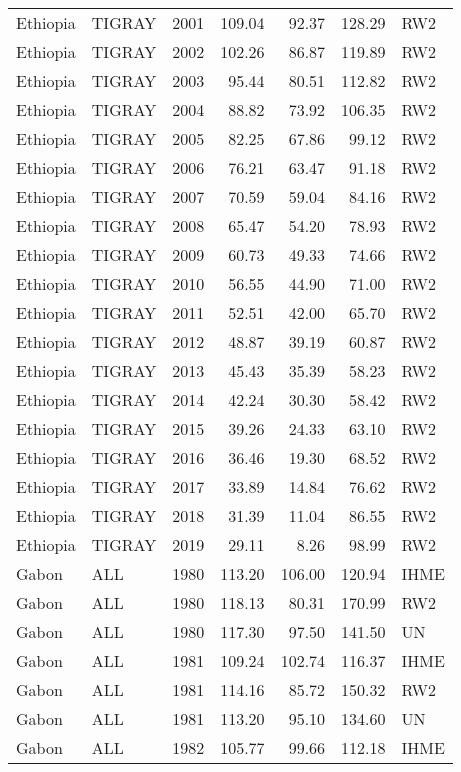 \begin{longtable}{lllrrrl}
  Ethiopia & TIGRAY & 2001 & 109.04 & 92.37 & 128.29 & RW2 \\ 
  Ethiopia & TIGRAY & 2002 & 102.26 & 86.87 & 119.89 & RW2 \\ 
  Ethiopia & TIGRAY & 2003 & 95.44 & 80.51 & 112.82 & RW2 \\ 
  Ethiopia & TIGRAY & 2004 & 88.82 & 73.92 & 106.35 & RW2 \\ 
  Ethiopia & TIGRAY & 2005 & 82.25 & 67.86 & 99.12 & RW2 \\ 
  Ethiopia & TIGRAY & 2006 & 76.21 & 63.47 & 91.18 & RW2 \\ 
  Ethiopia & TIGRAY & 2007 & 70.59 & 59.04 & 84.16 & RW2 \\ 
  Ethiopia & TIGRAY & 2008 & 65.47 & 54.20 & 78.93 & RW2 \\ 
  Ethiopia & TIGRAY & 2009 & 60.73 & 49.33 & 74.66 & RW2 \\ 
  Ethiopia & TIGRAY & 2010 & 56.55 & 44.90 & 71.00 & RW2 \\ 
  Ethiopia & TIGRAY & 2011 & 52.51 & 42.00 & 65.70 & RW2 \\ 
  Ethiopia & TIGRAY & 2012 & 48.87 & 39.19 & 60.87 & RW2 \\ 
  Ethiopia & TIGRAY & 2013 & 45.43 & 35.39 & 58.23 & RW2 \\ 
  Ethiopia & TIGRAY & 2014 & 42.24 & 30.30 & 58.42 & RW2 \\ 
  Ethiopia & TIGRAY & 2015 & 39.26 & 24.33 & 63.10 & RW2 \\ 
  Ethiopia & TIGRAY & 2016 & 36.46 & 19.30 & 68.52 & RW2 \\ 
  Ethiopia & TIGRAY & 2017 & 33.89 & 14.84 & 76.62 & RW2 \\ 
  Ethiopia & TIGRAY & 2018 & 31.39 & 11.04 & 86.55 & RW2 \\ 
  Ethiopia & TIGRAY & 2019 & 29.11 & 8.26 & 98.99 & RW2 \\ 
  Gabon & ALL & 1980 & 113.20 & 106.00 & 120.94 & IHME \\ 
  Gabon & ALL & 1980 & 118.13 & 80.31 & 170.99 & RW2 \\ 
  Gabon & ALL & 1980 & 117.30 & 97.50 & 141.50 & UN \\ 
  Gabon & ALL & 1981 & 109.24 & 102.74 & 116.37 & IHME \\ 
  Gabon & ALL & 1981 & 114.16 & 85.72 & 150.32 & RW2 \\ 
  Gabon & ALL & 1981 & 113.20 & 95.10 & 134.60 & UN \\ 
  Gabon & ALL & 1982 & 105.77 & 99.66 & 112.18 & IHME \\ 

\end{longtable}
